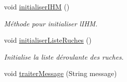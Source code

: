 \begin{DoxyCompactItemize}
\item 
void \hyperlink{classcom_1_1example_1_1bee__honeyt_1_1_i_h_m_mobile_a4aa9d23a3aebf2d1a3cd62a15a4e0f2d}{initialiser\+I\+HM} ()
\begin{DoxyCompactList}\small\item\em Méthode pour initialiser l\textquotesingle{}I\+HM. \end{DoxyCompactList}\item 
void \hyperlink{classcom_1_1example_1_1bee__honeyt_1_1_i_h_m_mobile_a1fb171bee5ff2ce052ad88fb9bc84718}{initialiser\+Liste\+Ruches} ()
\begin{DoxyCompactList}\small\item\em Initialise la liste déroulante des ruches. \end{DoxyCompactList}\item 
void \hyperlink{classcom_1_1example_1_1bee__honeyt_1_1_i_h_m_mobile_a4183e896e4eab05e7ca92735199425fa}{traiter\+Message} (String message)
\end{DoxyCompactItemize}
